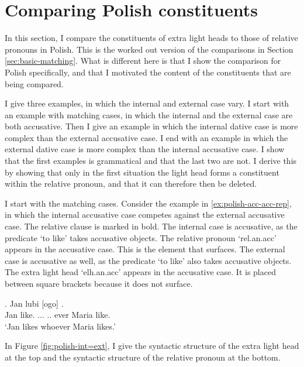 \section{Comparing Polish constituents}\label{sec:comparing-polish}

In this section, I compare the constituents of extra light heads to those of relative pronouns in Polish. This is the worked out version of the comparisons in Section \ref{sec:basic-matching}. What is different here is that I show the comparison for Polish specifically, and that I motivated the content of the constituents that are being compared.

I give three examples, in which the internal and external case vary.
I start with an example with matching cases, in which the internal and the external case are both accusative.
Then I give an example in which the internal dative case is more complex than the external accusative case.
I end with an example in which the external dative case is more complex than the internal accusative case.
I show that the first examples is grammatical and that the last two are not. I derive this by showing that only in the first situation the light head forms a constituent within the relative pronoun, and that it can therefore then be deleted.

I start with the matching cases.
Consider the example in \ref{ex:polish-acc-acc-rep}, in which the internal accusative case competes against the external accusative case. The relative clause is marked in bold.
The internal case is accusative, as the predicate  `to like' takes accusative objects. The relative pronoun  `\ac{rel}.\ac{an}.\ac{acc}' appears in the accusative case. This is the element that surfaces.
The external case is accusative as well, as the predicate  `to like' also takes accusative objects. The extra light head  `\ac{elh}.\ac{an}.\ac{acc}' appears in the accusative case. It is placed between square brackets because it does not surface.

\exg. Jan lubi [ogo]    .\\
 Jan like.\scsub{[acc]} ...  .. ever Maria like.\scsub{[acc]}\\
 `Jan likes whoever Maria likes.' \label{ex:polish-acc-acc-rep}

In Figure \ref{fig:polish-int=ext}, I give the syntactic structure of the extra light head at the top and the syntactic structure of the relative pronoun at the bottom.

